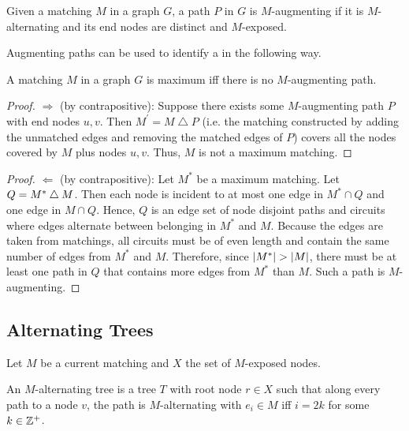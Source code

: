 \begin{definition}
    Given a matching $M$ in a graph $G$, a path $P$ in $G$ is $M$-augmenting if it is $M$-alternating and  
    its end nodes are distinct and $M$-exposed. 
    \label{def:augment_path}
\end{definition}

Augmenting paths can be used to identify a \maxmatch{} in the following way. 

\begin{theorem}
    A matching $M$ in a graph $G$ is maximum iff there is no $M$-augmenting path. 
    \label{thm:augmenting_path}
\end{theorem}
\begin{proof}
    $\Longrightarrow$ (by contrapositive): Suppose there exists some $M$-augmenting path $P$ with end nodes $u, v$. 
    Then $M^\prime = M \bigtriangleup P$ (i.e.\! the matching constructed by adding the unmatched edges and removing the matched edges of $P$)
    covers all the nodes covered by $M$ plus nodes $u, v$. Thus, $M$ is not a maximum matching. 
\end{proof}
\begin{proof}
    $\Longleftarrow$ (by contrapositive): Let $M^{\ast}$ be a maximum matching. Let $Q = M^{\ast} \bigtriangleup M$. 
    Then each node is incident to at most one edge in $M^{\ast} \cap Q$ and one edge in $M \cap Q$. Hence, $Q$ is an edge set 
    of node disjoint paths and circuits where edges alternate between belonging in $M^{\ast}$ and $M$. 
    Because the edges are taken from matchings, all circuits must be of even length 
    and contain the same number of edges from $M^{\ast}$ and $M$. Therefore, since $\left\lvert M^{\ast} \right\rvert > \left\lvert M \right\rvert$, 
    there must be at least one path in $Q$ that contains more edges from $M^{\ast}$ than $M$. Such a path is 
    $M$-augmenting. 
\end{proof}

\subsection{Alternating Trees}

Let $M$ be a current matching and $X$ the set of $M$-exposed nodes. 

\begin{definition}
    An $M$-alternating tree is a tree $T$ with root node $r \in X$ such that along every path to a node $v$, 
    the path is $M$-alternating with $e_i \in M$ iff $i = 2k$ for some $k \in \mathbb{Z}^+$. 
    \label{def:alternating_tree}
\end{definition}

